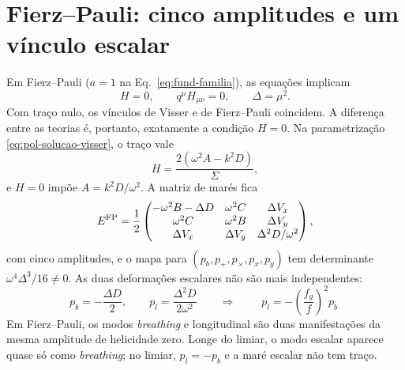 \section{Fierz--Pauli: cinco amplitudes e um vínculo escalar}

Em Fierz--Pauli ($a=1$ na Eq.~\ref{eq:fund-familia}), as equações
implicam
\begin{equation}
 H=0,\qquad q^\mu H_{\mu\nu}=0,\qquad \Delta=\mu^2.
 \label{eq:pol-vinculos-fp}
\end{equation}
Com traço nulo, os vínculos de Visser e de Fierz--Pauli coincidem. A
diferença entre as teorias é, portanto, exatamente a condição $H=0$.
Na parametrização \eqref{eq:pol-solucao-visser}, o traço vale
\begin{equation}
 H=\frac{2\left(\omega^2A-k^2D\right)}{\Sigma},
 \label{eq:pol-traco}
\end{equation}
e $H=0$ impõe $A=k^2D/\omega^2$. A matriz de marés fica
\begin{equation}
 E^{\rm FP}=\frac12
 \begin{pmatrix}
 -\omega^2B-\Delta D & \omega^2C & \Delta V_x\\
 \omega^2C & \omega^2B & \Delta V_y\\
 \Delta V_x & \Delta V_y & \Delta^2D/\omega^2
 \end{pmatrix},
 \label{eq:pol-mares-fp}
\end{equation}
com cinco amplitudes, e o mapa para $(p_b,p_+,p_\times,p_x,p_y)$ tem
determinante $\omega^4\Delta^3/16\neq0$. As duas deformações escalares
não são mais independentes:
\begin{equation}
 p_b=-\frac{\Delta D}{2},\qquad
 p_l=\frac{\Delta^2D}{2\omega^2}
 \qquad\Longrightarrow\qquad
 \boxed{\;p_l=-\left(\frac{f_g}{f}\right)^2p_b\;}
 \label{eq:pol-vinculo-escalar}
\end{equation}
Em Fierz--Pauli, os modos \emph{breathing} e longitudinal são duas
manifestações da mesma amplitude de helicidade zero. Longe do limiar, o
modo escalar aparece quase só como \emph{breathing}; no limiar,
$p_l=-p_b$ e a maré escalar não tem traço.

